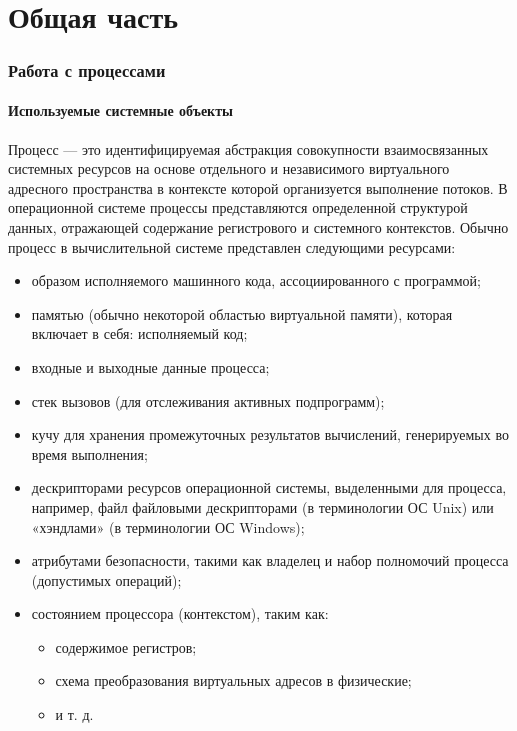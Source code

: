 \documentclass[a4paper,14pt]{extarticle}
\begin{document}

\newpage

\tableofcontents
\newpage
\
\part{Общая часть}
\section{Работа с процессами}
\subsection{Используемые системные объекты}
Процесс --- это идентифицируемая абстракция совокупности взаимосвязанных системных ресурсов на основе отдельного и независимого виртуального адресного пространства в контексте которой организуется выполнение потоков. В операционной системе процессы представляются определенной
структурой данных, отражающей содержание регистрового и системного контекстов.
Обычно процесс в вычислительной системе представлен следующими ресурсами:
\begin{itemize}
	\item образом исполняемого машинного кода, ассоциированного с программой;
	\item памятью (обычно некоторой областью виртуальной памяти), которая включает в себя:
	исполняемый код;
	\item входные и выходные данные процесса;
	\item стек вызовов (для отслеживания активных подпрограмм);
	\item кучу для хранения промежуточных результатов вычислений, генерируемых во время выполнения;
	\item дескрипторами ресурсов операционной системы, выделенными для процесса, например, файл
	файловыми дескрипторами (в терминологии ОС Unix) или «хэндлами» (в терминологии ОС Windows);
	\item атрибутами безопасности, такими как владелец и набор полномочий процесса (допустимых операций);
	\item состоянием процессора (контекстом), таким как:
	\begin{itemize}
		\item содержимое регистров;
		\item схема преобразования виртуальных адресов в физические;
		\item и т. д.
	\end{itemize}	
\end{itemize}
\end{document}
